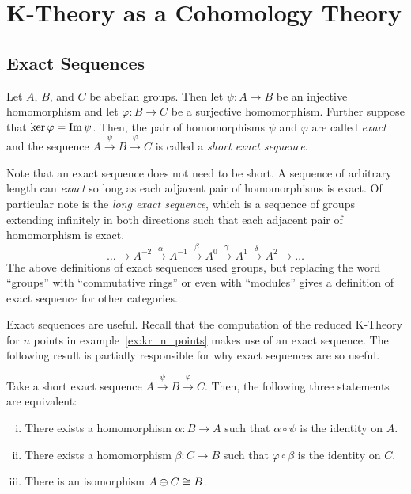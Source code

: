 \documentclass[../sean_thesis.tex]{subfiles}
\begin{document}
\chapter{K-Theory as a Cohomology Theory}

\section{Exact Sequences}

\begin{definition}
	Let $A$, $B$, and $C$ be abelian groups. Then let $\psi: A \to B$ be an injective homomorphism and let $\varphi: B \to C$ be a surjective homomorphism. Further suppose that $\ker\varphi = \operatorname{Im}\psi$. Then, the pair of homomorphisms $\psi$ and $\varphi$ are called \emph{exact} and the sequence $A \xrightarrow{\psi} B \xrightarrow{\varphi} C$ is called a \emph{short exact sequence}.
\end{definition}

Note that an exact sequence does not need to be short. A sequence of arbitrary length can \emph{exact} so long as each adjacent pair of homomorphisms is exact. Of particular note is the \emph{long exact sequence}, which is a sequence of groups extending infinitely in both directions such that each adjacent pair of homomorphism is exact.
\begin{equation*}
	\dots \xrightarrow{} A^{-2} \xrightarrow{\alpha} A^{-1} \xrightarrow{\beta} A^{0} \xrightarrow{\gamma} A^{1} \xrightarrow{\delta} A^{2} \xrightarrow{} \dots
\end{equation*}
The above definitions of exact sequences used groups, but replacing the word ``groups'' with ``commutative rings'' or even with ``modules'' gives a definition of exact sequence for other categories.

Exact sequences are useful. Recall that the computation of the reduced K-Theory for $n$ points in example~\ref{ex:kr_n_points} makes use of an exact sequence. The following result is partially responsible for why exact sequences are so useful.

\begin{claim} Take a short exact sequence $A \xrightarrow{\psi} B \xrightarrow{\varphi} C$. Then, the following three statements are equivalent:
\vspace{-\varparskip}
	\begin{enumerate}[(i)]
		\item There exists a homomorphism $\alpha: B \to A$ such that $\alpha \circ \psi$ is the identity on $A$.
		\item There exists a homomorphism $\beta: C \to B$ such that $\varphi \circ \beta$ is the identity on $C$.
		\item There is an isomorphism $A \oplus C \cong B$.
	\end{enumerate}
\end{claim}
\end{document}
